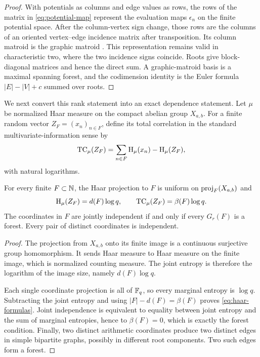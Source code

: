 \begin{proof}
With potentials as columns and edge values as rows, the rows of the matrix in
\eqref{eq:potential-map} represent the evaluation maps $\epsilon_n$ on the
finite potential space.  After the column-vertex sign change, those rows are
the columns of an oriented vertex--edge incidence matrix after transposition.
Its column matroid is the graphic matroid \citep{Whitney1935}.  This
representation remains valid in characteristic two, where the two incidence
signs coincide.  Roots give block-diagonal matrices and hence the direct sum.
A graphic-matroid basis is a maximal spanning forest, and the codimension
identity is the Euler formula
$|E|-|V|+c$ summed over roots.
\end{proof}

We next convert this rank statement into an exact dependence statement.  Let
$\mu$ be normalized Haar measure on the compact abelian group $X_{a,b}$.  For
a finite random vector $Z_F=(x_n)_{n\in F}$, define its total correlation in
the standard multivariate-information sense \citep{Watanabe1960} by
\begin{equation}\label{eq:total-correlation-definition}
 \operatorname{TC}_\mu(Z_F)=\sum_{n\in F}\operatorname{H}_\mu(x_n)-\operatorname{H}_\mu(Z_F),
\end{equation}
with natural logarithms.

\begin{proposition}\label{prop:haar}
For every finite $F\subset\mathbb N$, the Haar projection to $F$ is uniform on
$\operatorname{proj}_F(X_{a,b})$ and
\begin{equation}\label{eq:haar-formulas}
 \operatorname{H}_\mu(Z_F)=d(F)\log q,
 \qquad
 \operatorname{TC}_\mu(Z_F)=\beta(F)\log q.
\end{equation}
The coordinates in $F$ are jointly independent if and only if every
$G_r(F)$ is a forest.  Every pair of distinct coordinates is independent.
\end{proposition}

\begin{proof}
The projection from $X_{a,b}$ onto its finite image is a continuous
surjective group homomorphism.  It sends Haar measure to Haar measure on the
finite image, which is normalized counting measure.  The joint entropy is
therefore the logarithm of the image size, namely $d(F)\log q$.

Each single coordinate projection is all of $\mathbb F_q$, so every marginal entropy
is $\log q$.  Subtracting the joint entropy and using
$|F|-d(F)=\beta(F)$ proves \eqref{eq:haar-formulas}.  Joint independence is
equivalent to equality between joint entropy and the sum of marginal
entropies, hence to $\beta(F)=0$, which is exactly the forest condition.
Finally, two distinct arithmetic coordinates produce two distinct edges in
simple bipartite graphs, possibly in different root components.  Two such
edges form a forest.
\end{proof}

